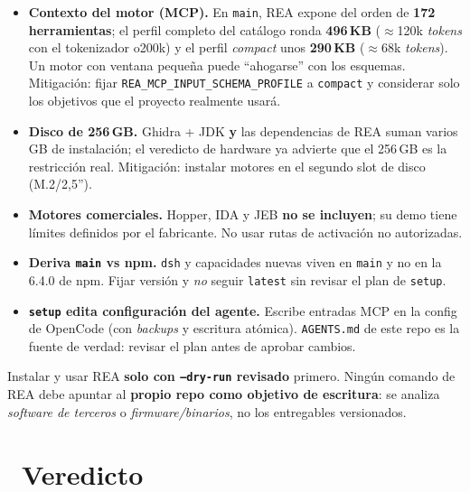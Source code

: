 \documentclass[11pt,a4paper]{article}
\newcommand{\iconotexto}[2]{\textcolor{cyanNeon}{\faIcon{#1}}~#2}
\begin{document}
\begin{tcolorbox}[cajaMejora, title={\faIcon{exclamation-triangle}~Tensiones a vigilar}]
\begin{itemize}[leftmargin=1.2em]
  \item \textbf{Contexto del motor (MCP).} En \texttt{main}, REA expone del orden de
  \textbf{172 herramientas}; el perfil completo del catálogo ronda \textbf{496\,KB}
  (\(\approx\)120k \emph{tokens} con el tokenizador o200k) y el perfil \emph{compact} unos
  \textbf{290\,KB} (\(\approx\)68k \emph{tokens}). Un motor con ventana pequeña puede
  ``ahogarse'' con los esquemas. Mitigación: fijar \texttt{REA\_MCP\_INPUT\_SCHEMA\_PROFILE}
  a \texttt{compact} y considerar solo los objetivos que el proyecto realmente usará.
  \item \textbf{Disco de 256\,GB.} Ghidra + JDK \textbf{y} las dependencias de REA suman
  varios GB de instalación; el veredicto de hardware ya advierte que el 256\,GB es la
  restricción real. Mitigación: instalar motores en el segundo slot de disco (M.2/2{,}5'').
  \item \textbf{Motores comerciales.} Hopper, IDA y JEB \textbf{no se incluyen}; su demo
  tiene límites definidos por el fabricante. No usar rutas de activación no autorizadas.
  \item \textbf{Deriva \texttt{main} vs npm.} \texttt{dsh} y capacidades nuevas viven en
  \texttt{main} y no en la 6.4.0 de npm. Fijar versión y \emph{no} seguir \texttt{latest}
  sin revisar el plan de \texttt{setup}.
  \item \textbf{\texttt{setup} edita configuración del agente.} Escribe entradas MCP en
  la config de OpenCode (con \emph{backups} y escritura atómica). \texttt{AGENTS.md} de
  este repo es la fuente de verdad: revisar el plan antes de aprobar cambios.
\end{itemize}
\end{tcolorbox}

\begin{tcolorbox}[cajaRecomendacion, title={\faIcon{clipboard-check}~Regla de oro para el repo}]
Instalar y usar REA \textbf{solo con \texttt{--dry-run} revisado} primero. Ningún comando
de REA debe apuntar al \textbf{propio repo como objetivo de escritura}: se analiza
\emph{software de terceros} o \emph{firmware/binarios}, no los entregables versionados.
\end{tcolorbox}

\section[Veredicto]{\iconotexto{balance-scale}{Veredicto}}
\end{document}
